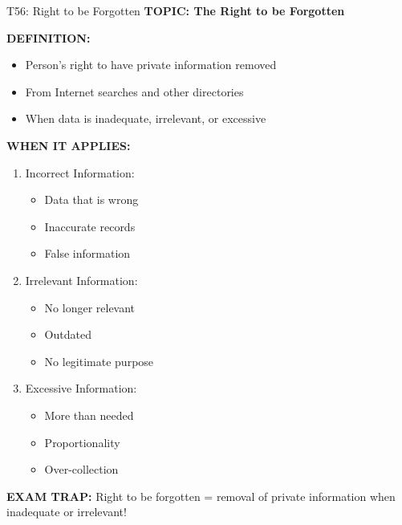\documentclass[8pt]{beamer}
\begin{document}
	\begin{frame}{T56: Right to be Forgotten}
		\fontsize{6.5}{7.5}\selectfont
		\textbf{TOPIC: The Right to be Forgotten}
		
		\vspace{0.1cm}
		\textbf{DEFINITION:}
		\begin{itemize}
			\item Person's right to have private information removed
			\item From Internet searches and other directories
			\item When data is inadequate, irrelevant, or excessive
		\end{itemize}
		
		\vspace{0.1cm}
		\textbf{WHEN IT APPLIES:}
		\begin{enumerate}
			\item \textcolor{myblue}{Incorrect Information:}
			\begin{itemize}
				\item Data that is wrong
				\item Inaccurate records
				\item False information
			\end{itemize}
			\item \textcolor{myblue}{Irrelevant Information:}
			\begin{itemize}
				\item No longer relevant
				\item Outdated
				\item No legitimate purpose
			\end{itemize}
			\item \textcolor{myblue}{Excessive Information:}
			\begin{itemize}
				\item More than needed
				\item Proportionality
				\item Over-collection
			\end{itemize}
		\end{enumerate}
		
		\textcolor{myred}{\textbf{EXAM TRAP:}} Right to be forgotten = \textcolor{myblue}{removal of private information when inadequate or irrelevant}!
	\end{frame}
	
\end{document}
